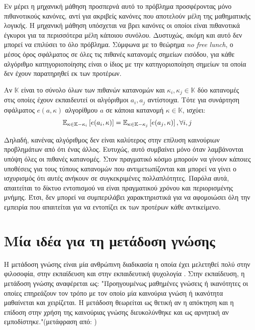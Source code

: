 Εν μέρει η μηχανική μάθηση προσπερνά αυτό το πρόβλημα προσφέροντας μόνο πιθανοτικούς κανόνες, αντί για ακριβείς κανόνες που αποτελούν μέλη της μαθηματικής λογικής. Η μηχανική μάθηση υπόσχεται να βρει κανόνες οι οποίοι είναι πιθανοτικά έγκυροι για τα περισσότερα μέλη κάποιου συνόλου. Δυστυχώς, ακόμη και αυτό δεν μπορεί να επιλύσει το όλο πρόβλημα. Σύμφωνα με το θεώρημα \textit{no free lunch}, ο μέσος όρος σφάλματος σε όλες τις πιθανές κατανομές σημείων εισόδου, για κάθε αλγόριθμο κατηγοριοποίησης είναι ο ίδιος με την κατηγοριοποίηση σημείων τα οποία δεν έχουν παρατηρηθεί εκ των προτέρων.

Αν $ \mathbb{K} $ είναι το σύνολο όλων των πιθανών κατανομών και $ \kappa_i, \kappa_j \in \mathbb{K}$ δύο κατανομές στις οποίες έχουν εκπαιδευτεί
οι αλγόριθμοι $a_i, a_j$ αντίστοιχα. Τότε για συνάρτηση σφάλματος $e(a,\kappa)$ αλγορίθμου $a$ σε κάποια κατανομή $\kappa \in \mathbb{K}$, ισχύει:
$$ \operatorname{\mathbb{E}}_{\kappa \in \mathbb{K}-\kappa_i}\left[ e(a_i, \kappa) \right] = \operatorname{\mathbb{E}}_{\kappa \in \mathbb{K}-\kappa_j}\left[ e(a_j, \kappa) \right], \forall i,j
$$ 

Δηλαδή, κανένας αλγόριθμος δεν είναι καλύτερος στην επίλυση καινούριων προβλημάτων από ότι ένας άλλος. Ευτυχώς,
αυτό συμβαίνει μόνο όταν λαμβάνονται υπόψη όλες οι πιθανές κατανομές. Στον πραγματικό κόσμο μπορούν να γίνουν κάποιες
υποθέσεις για τους τύπους κατανομών που αντιμετωπίζονται και μπορεί να γίνει ο ισχυρισμός ότι αυτές ανήκουν σε συγκεκριμένες πολλαπλότητες.
Παρόλα αυτά, απαιτείται το δίκτυο εντοπισμού να είναι πραγματικού χρόνου και περιορισμένης μνήμης. Έτσι, δεν μπορεί 
να συμπεριλάβει χαρακτηριστικά για να αφομοιώσει όλη την εμπειρία που απαιτείται για να εντοπίζει εκ των προτέρων κάθε αντικείμενο.

\section{Μία ιδέα για τη μετάδοση γνώσης \cite{38}}
Η μετάδοση γνώσης είναι μία ανθρώπινη διαδικασία η οποία έχει μελετηθεί πολύ στην
φιλοσοφία, στην εκπαίδευση και στην εκπαιδευτική ψυχολογία \cite{39}. Στην εκπαίδευση, η μετάδοση
γνώσης αναφέρεται ως:
"Προηγουμένως μαθημένες γνώσεις ή ικανότητες οι οποίες επηρεάζουν τον τρόπο με τον οποίο
μία καινούρια γνώση ή ικανότητα μαθαίνεται και χειρίζεται. Η μετάδοση θεωρείται ως θετική
αν η απόκτηση και η επίδοση στην χρήση της καινούριας γνώσης διευκολύνθηκε και ως αρνητική
αν εμποδίστηκε."(μετάφραση από: \cite{76})

